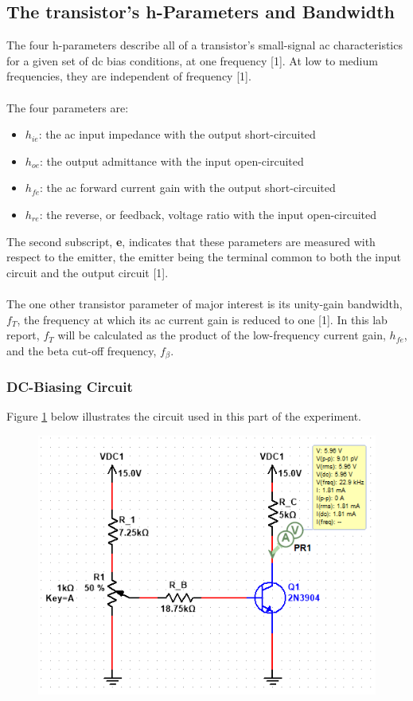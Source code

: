 \documentclass{article}
\begin{document}
	\subsection{The transistor's h-Parameters and Bandwidth}
	The four h-parameters describe all of a transistor's small-signal ac characteristics for a given set of dc bias conditions, at one frequency [1].
	At low to medium frequencies, they are independent of frequency [1].\\\\
	The four parameters are:
	\begin{itemize}
		\item $h_{ie}$: the ac input impedance with the output short-circuited
		\item $h_{oe}$: the output admittance with the input open-circuited
		\item $h_{fe}$: the ac forward current gain with the output short-circuited
		\item $h_{re}$: the reverse, or feedback, voltage ratio with the input open-circuited		
	\end{itemize}
	The second subscript, \textbf{e}, indicates that these parameters are measured with respect to the emitter, the emitter being the terminal common to both the input circuit and the output circuit [1].\\\\
	The one other transistor parameter of major interest is its unity-gain bandwidth, $f_T$, the frequency at which its ac current gain is reduced to one [1].
	In this lab report, $f_T$ will be calculated as the product of the low-frequency current gain, $h_{fe}$, and the beta cut-off frequency, $f_{\beta}$.
	
	\subsubsection{DC-Biasing Circuit}
	Figure \ref{f21} below illustrates the circuit used in this part of the experiment.
	\begin{figure}[!ht]
		\centering
		\includegraphics[width=0.8\linewidth]{part4-a1.png}
		\label{f21}
	\end{figure}
	
\end{document}
